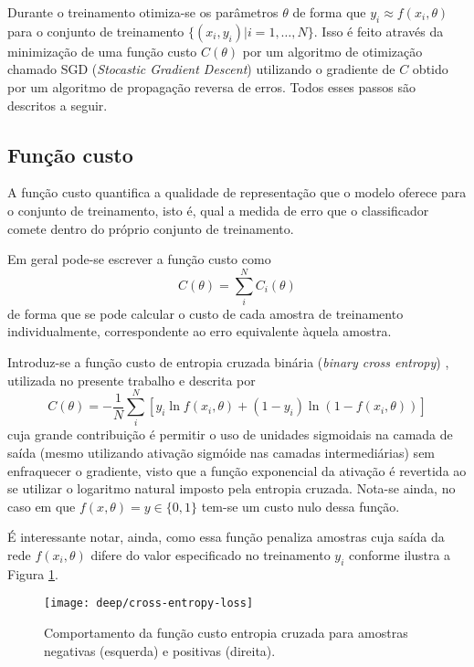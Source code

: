 Durante o treinamento otimiza-se os parâmetros $\theta$ de forma que $y_i \approx f(x_i, \theta)$ para o conjunto de treinamento $\{ (x_i, y_i) | i=1,\dots,N \}$. Isso é feito através da minimização de uma função custo $C(\theta)$ por um algoritmo de otimização chamado SGD (\textit{Stocastic Gradient Descent}) utilizando o gradiente de $C$ obtido por um algoritmo de propagação reversa de erros. Todos esses passos são descritos a seguir.

\subsection{Função custo}
A função custo quantifica a qualidade de representação que o modelo oferece para o conjunto de treinamento, isto é, qual a medida de erro que o classificador comete dentro do próprio conjunto de treinamento.

Em geral pode-se escrever a função custo como
\begin{equation}
C(\theta) = \sum_i^N C_i(\theta)
\end{equation}
de forma que se pode calcular o custo de cada amostra de treinamento individualmente, correspondente ao erro equivalente àquela amostra.

Introduz-se a função custo de entropia cruzada binária (\textit{binary cross entropy}) \cite{bishop2007}, utilizada no presente trabalho e descrita por
\begin{equation}
\label{eq:bcr}
C(\theta) = -\frac{1}{N} \sum_i^N \left[y_i \ln f(x_i,\theta) + (1-y_i) \ln (1-f(x_i,\theta))\right]
\end{equation}
cuja grande contribuição é permitir o uso de unidades sigmoidais na camada de saída (mesmo utilizando ativação sigmóide nas camadas intermediárias) sem enfraquecer o gradiente, visto que a função exponencial da ativação é revertida ao se utilizar o logaritmo natural imposto pela entropia cruzada. Nota-se ainda, no caso em que $f(x,\theta)=y \in \{0, 1\}$ tem-se um custo nulo dessa função.

É interessante notar, ainda, como essa função penaliza amostras cuja saída da rede $f(x_i,\theta)$ difere do valor especificado no treinamento $y_i$ conforme ilustra a Figura \ref{fig:plot-cost}.

\begin{figure}
\centering
\texttt{[image: deep/cross-entropy-loss]}
\caption{Comportamento da função custo entropia cruzada para amostras negativas (esquerda) e positivas (direita).}
\label{fig:plot-cost}
\end{figure}

